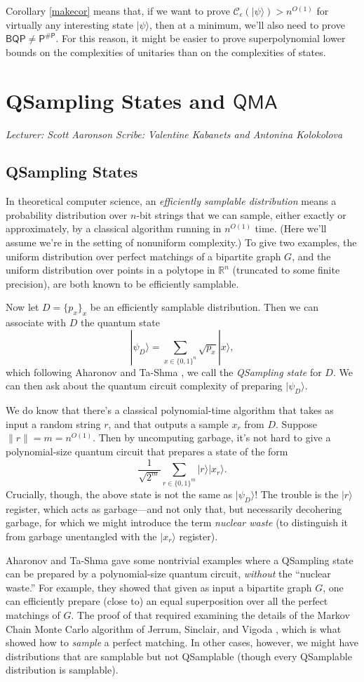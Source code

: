 \documentclass[12pt]{report}
\theoremstyle{plain}
\theoremstyle{definition}
\newcommand{\R}{{\mathbb R}}
\renewcommand{\ket}[1]{|#1\rangle}
\newcommand{\sizee}{\ensuremath{\mathcal{C}_\epsilon}}
\newcommand{\lecture}[3]{%
  \chapter{#3}%
  \vspace{-5ex}%
  \textit{Lecturer: #1 \hfill Scribe: #2}\par%
  \vspace{1ex}\titlerule\vspace{2ex}}
\begin{document}
Corollary \ref{makecor} means that, if we want to prove $\sizee(\ket{\psi}) > n^{O(1)}$ for virtually any interesting state $\ket{\psi}$, then at a minimum, we'll also need to prove $\mathsf{BQP} \neq \mathsf{P^{\#P}}$.  For this reason, it might be easier to prove superpolynomial lower bounds on the complexities of unitaries than on the complexities of states.


\lecture{Scott Aaronson}{Valentine Kabanets and Antonina Kolokolova}{QSampling States and $\mathsf{QMA}$}

\section{QSampling States}

In theoretical computer science, an {\em efficiently samplable distribution} means a probability distribution over $n$-bit strings that we can sample, either exactly or approximately, by a classical algorithm running in $n^{O(1)}$ time.  (Here we'll assume we're in the setting of nonuniform complexity.)  To give two examples, the uniform distribution over perfect matchings of a bipartite graph $G$, and the uniform distribution over points in a polytope in $\R^n$ (truncated to some finite precision), are both known to be efficiently samplable.

Now let $D=\{p_x\}_x$ be an efficiently samplable distribution. Then we can associate with $D$ the quantum state
\[
\ket{\psi_D} = \sum_{x \in \{0,1\}^n} \sqrt{p_x} \ket{x},
\]
which following Aharonov and Ta-Shma \cite{at}, we call the {\em QSampling state} for $D$.  We can then ask about the quantum circuit complexity of preparing $\ket{\psi_D}$.

We do know that there's a classical polynomial-time algorithm that takes as input a random string $r$, and that outputs a sample $x_r$ from $D$.  Suppose $\|r\| = m = n^{O(1)}$.  Then by uncomputing garbage, it's not hard to give a polynomial-size quantum circuit that prepares a state of the form
\[
\frac{1}{\sqrt{2^m}} \sum_{r \in \{0,1\}^m} \ket{r} \ket{x_r}.
\]
Crucially, though, the above state is not the same as $\ket{\psi_D}$!  The trouble is the $\ket{r}$ register, which acts as garbage---and not only that, but necessarily decohering garbage, for which we might introduce the term {\em nuclear waste} (to distinguish it from garbage unentangled with the $\ket{x_r}$ register).

Aharonov and Ta-Shma \cite{at} gave some nontrivial examples where a QSampling state can be prepared by a polynomial-size quantum circuit, {\em without} the ``nuclear waste.''  For example, they showed that given as input a bipartite graph $G$, one can efficiently prepare (close to) an equal superposition over all the perfect matchings of $G$.  The proof of that
required examining the details of the Markov Chain Monte Carlo algorithm of Jerrum, Sinclair, and Vigoda \cite{jsv}, which is what showed how to {\em sample} a perfect matching.  In other cases, however, we might have distributions that are samplable but not QSamplable (though every QSamplable distribution is samplable).
\end{document}
